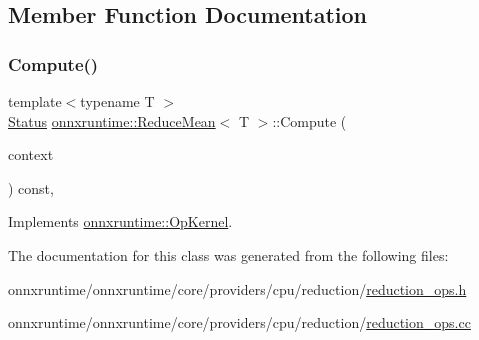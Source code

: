 \subsection{Member Function Documentation}
\mbox{\label{classonnxruntime_1_1ReduceMean_a5c9330e5da41f3b6fa14fc3c43ca6b50}} 
\subsubsection{\texorpdfstring{Compute()}{Compute()}}
{\footnotesize\ttfamily template$<$typename T $>$ \\
\mbox{\hyperlink{classonnxruntime_1_1common_1_1Status}{Status}} \mbox{\hyperlink{classonnxruntime_1_1ReduceMean}{onnxruntime\+::\+Reduce\+Mean}}$<$ T $>$\+::Compute (\begin{DoxyParamCaption}\item[{\mbox{\hyperlink{classonnxruntime_1_1OpKernelContext}{Op\+Kernel\+Context}} $\ast$}]{context }\end{DoxyParamCaption}) const\hspace{0.3cm}{\ttfamily [override]}, {\ttfamily [virtual]}}



Implements \mbox{\hyperlink{classonnxruntime_1_1OpKernel_a9eca8656a78b1b3ab9d3351a12798650}{onnxruntime\+::\+Op\+Kernel}}.



The documentation for this class was generated from the following files\+:\begin{DoxyCompactItemize}
\item 
onnxruntime/onnxruntime/core/providers/cpu/reduction/\mbox{\hyperlink{cpu_2reduction_2reduction__ops_8h}{reduction\+\_\+ops.\+h}}\item 
onnxruntime/onnxruntime/core/providers/cpu/reduction/\mbox{\hyperlink{cpu_2reduction_2reduction__ops_8cc}{reduction\+\_\+ops.\+cc}}\end{DoxyCompactItemize}
